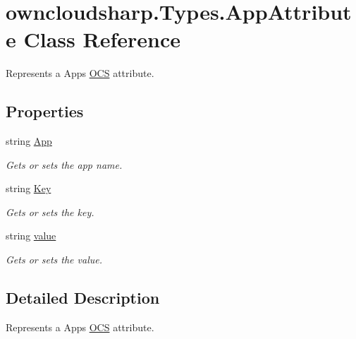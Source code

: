 \hypertarget{classowncloudsharp_1_1_types_1_1_app_attribute}{}\section{owncloudsharp.\+Types.\+App\+Attribute Class Reference}
\label{classowncloudsharp_1_1_types_1_1_app_attribute}


Represents a Apps \hyperlink{classowncloudsharp_1_1_types_1_1_o_c_s}{O\+CS} attribute.  


\subsection*{Properties}
\begin{DoxyCompactItemize}
\item 
string \hyperlink{classowncloudsharp_1_1_types_1_1_app_attribute_a3d8aaa71111ab1a2140e02fd2772e938}{App}
\begin{DoxyCompactList}\small\item\em Gets or sets the app name. \end{DoxyCompactList}\item 
string \hyperlink{classowncloudsharp_1_1_types_1_1_app_attribute_a06720302305fa7ae8cb08121fd533d75}{Key}
\begin{DoxyCompactList}\small\item\em Gets or sets the key. \end{DoxyCompactList}\item 
string \hyperlink{classowncloudsharp_1_1_types_1_1_app_attribute_a9bb5cce7716b37c3de9ffceea023e574}{value}
\begin{DoxyCompactList}\small\item\em Gets or sets the value. \end{DoxyCompactList}\end{DoxyCompactItemize}


\subsection{Detailed Description}
Represents a Apps \hyperlink{classowncloudsharp_1_1_types_1_1_o_c_s}{O\+CS} attribute. 




